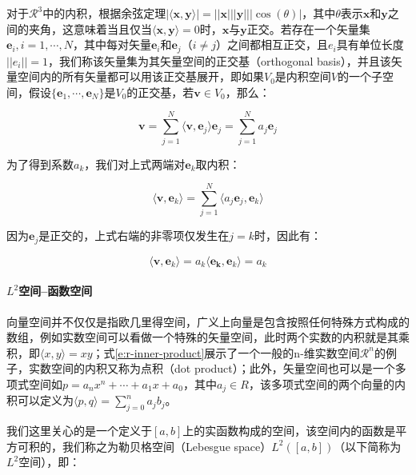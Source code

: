 对于$\mathcal{R}^{3}$中的内积，根据余弦定理$|\langle\mathbf{x},\mathbf{y}\rangle |=||\mathbf{x}|||\mathbf{y}|||\cos(\theta)|$，其中$\theta$表示$\mathbf{x}$和$\mathbf{y}$之间的夹角，这意味着当且仅当$\langle\mathbf{x},\mathbf{y}\rangle=0$时，$\mathbf{x}$与$\mathbf{y}$正交。若存在一个矢量集$\mathbf{e}_i,i=1,\cdots,N$，其中每对矢量$\mathbf{e}_i$和$\mathbf{e}_j$（$i\neq j$）之间都相互正交，且$e_i$具有单位长度$||e_i||=1$，我们称该矢量集为其矢量空间的正交基（orthogonal basis），并且该矢量空间内的所有矢量都可以用该正交基展开，即如果$V_0$是内积空间$V$的一个子空间，假设$\{\mathbf{e}_1,\cdots,\mathbf{e}_N\}$是$V_0$的正交基，若$\mathbf{v}\in V_0$，那么：

\begin{equation}\label{e:r-basis-expand}
	\mathbf{v}=\sum^{N}_{j=1}\langle\mathbf{v},\mathbf{e}_j\rangle\mathbf{e}_j=\sum^{N}_{j=1}a_j\mathbf{e}_j
\end{equation}

\noindent 为了得到系数$a_k$，我们对上式两端对$\mathbf{e}_k$取内积：

\begin{equation}
	\langle\mathbf{v},\mathbf{e}_k\rangle=\sum^{N}_{j=1}\langle a_j\mathbf{e}_j,\mathbf{e}_k\rangle
\end{equation}

\noindent 因为$\mathbf{e}_j$是正交的，上式右端的非零项仅发生在$j=k$时，因此有：

\begin{equation}\label{e:r-coefficients}
	\langle\mathbf{v},\mathbf{e}_k\rangle=a_k\langle\mathbf{e_k},\mathbf{e}_k\rangle=a_k
\end{equation}




\paragraph{$L^{2}$空间--函数空间}
向量空间并不仅仅是指欧几里得空间，广义上向量是包含按照任何特殊方式构成的数组，例如实数空间可以看做一个特殊的矢量空间，此时两个实数的内积就是其乘积，即$\langle x,y\rangle=xy$；式\ref{e:r-inner-product}展示了一个一般的n-维实数空间$\mathcal{R}^{n}$的例子，实数空间的内积又称为点积（dot product）；此外，矢量空间也可以是一个多项式空间如$p=a_nx^{n}+\cdots +a_1x+a_0$，其中$a_j\in R$，该多项式空间的两个向量的内积可以定义为$\langle p,q\rangle=\sum^{n}_{j=0}a_jb_j$。

我们这里关心的是一个定义于$[a,b]$上的实函数构成的空间，该空间内的函数是平方可积的，我们称之为勒贝格空间（Lebesgue space）$L^{2}([a,b])$（以下简称为$L^{2}$空间），即：

